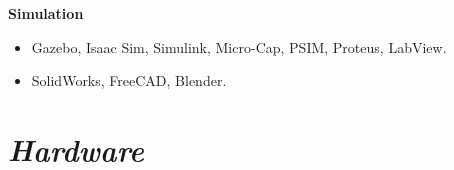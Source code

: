 \documentclass[10pt,a4paper,sans]{moderncv} %
\newif\ifen
\newif\iffr
\newif\ifpt
\newcommand{\en}[2][]{\ifen#2\else#1\fi}
\newcommand{\fr}[2][]{\iffr#2\else#1\fi}
\newcommand{\pt}[2][]{\ifpt#2\else#1\fi}
\begin{document}
\begin{tcolorbox}
\begin{minipage}[t]{0.33\textwidth}
\begin{tcolorbox}[grow to left by=0.6cm,colback=darkdarkgrey,colframe=darkdarkgrey,arc=0mm]
            \normalsize
            
            \vspace*{-1mm}
            
            \textcolor{bluegrey}{\hrulefill\newline}
            \hspace*{-1.5mm}\textcolor{bluegrey}{\textbf{\pt[Simulation]{Simulação}}}
            
            \small 
            
            \begin{itemize}
                \item[\faAngleRight] Gazebo, Isaac Sim, Simulink, Micro-Cap, PSIM, Proteus, LabView. 
            \end{itemize}
            
            \normalsize
            
            \vspace*{-3mm}
            
            \textcolor{bluegrey}{\hrulefill\newline}
            \hspace*{-1.5mm}\textcolor{bluegrey}{\textbf{\en{CAD and 3D modelling}\pt{\textit{CAD} e modelagem 3D}}}
            
            \small 
            
            \begin{itemize}
                \item[\faAngleRight] SolidWorks, FreeCAD, Blender.
            \end{itemize}
            
            \normalsize
            
            \vspace*{-3mm}
            
            
            \section{\textbf{\faCalculator\hspace{1mm}\en[\textit{Hardware}]{Hardware}}}
            
            \small 


\end{tcolorbox}
\end{minipage}
\end{tcolorbox}
\end{document}
